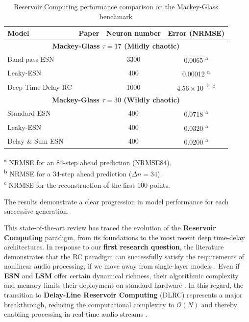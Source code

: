 \begin{table}[H]
\centering
\caption{Reservoir Computing performance comparison on the Mackey-Glass benchmark}
\label{tab:mackey_glass_all}
\begin{tabular}{@{}lccc@{}}
\toprule
\textbf{Model} & \textbf{Paper} & \textbf{Neuron number} & \textbf{Error (NRMSE)} \\ \midrule
\multicolumn{4}{c}{\textbf{Mackey-Glass $\tau=17$ (Mildly chaotic)}} \\ \midrule
Band-pass ESN & \cite{wyffels2008band} & 3300 & 0.0065 \textsuperscript{a} \\
Leaky-ESN & \cite{Jaeger10ESN} & 400  & 0.00012 \textsuperscript{a} \\
Deep Time-Delay RC & \cite{goldmann2020deep} & 1000 & $4.56 \times 10^{-5}$ \textsuperscript{b} \\
\midrule
\multicolumn{4}{c}{\textbf{Mackey-Glass $\tau=30$ (Wildly chaotic)}} \\ \midrule
Standard ESN & \cite{holzmann2010echo} & 400 & 0.0718 \textsuperscript{a} \\
Leaky-ESN & \cite{Jaeger10ESN} & 400 & 0.0320 \textsuperscript{a} \\
Delay \& Sum ESN & \cite{holzmann2010echo} & 400 & 0.0200 \textsuperscript{a} \\
 \bottomrule
\end{tabular}

\vspace{1ex}
\raggedright
\small
\textsuperscript{a} NRMSE for an 84-step ahead prediction (NRMSE84).\\
\textsuperscript{b} NRMSE for a 34-step ahead prediction ($\Delta n = 34$).\\
\textsuperscript{c} NRMSE for the reconstruction of the first 100 points.
\end{table}

The results demonstrate a clear progression in model performance for each successive generation. 

\vspace{0.5cm}

This state-of-the-art review has traced the evolution of the \textbf{Reservoir Computing} paradigm, from its foundations to the most recent deep time-delay architectures. In response to our \textbf{first research question}, the literature demonstrates that the RC paradigm can successfully satisfy the requirements of nonlinear audio processing, if we move away from single-layer models \cite{holzmann2010echo, jaeger2004harnessing}. Even if \textbf{ESN} and \textbf{LSM} offer certain dynamical richness, their algorithmic complexity and memory limits their deployment on standard hardware \cite{holzmann2010echo, Keuninckx2017RealTime}. In this regard, the transition to \textbf{Delay-Line Reservoir Computing} (DLRC) represents a major breakthrough, reducing the computational complexity to $\mathcal{O}(N)$ and thereby enabling processing in real-time audio streams \cite{Appeltant2011Information, Keuninckx2017RealTime}.

